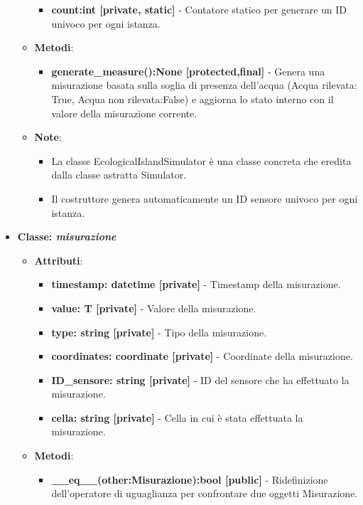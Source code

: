 \begin{itemize}
\begin{itemize}
    \begin{itemize}
        \item \textbf{count:int [private, static]} - Contatore statico per generare un ID univoco per ogni istanza.
    \end{itemize}
    \item    \textbf{Metodi}: 
    \begin{itemize}
        \item \textbf{generate\_measure():None [protected,final]} - Genera una misurazione basata sulla soglia di presenza dell'acqua (Acqua rilevata: True, Acqua non rilevata:False) e aggiorna lo stato interno con il valore della misurazione corrente.
    \end{itemize}
    \item    \textbf{Note}:
    \begin{itemize}
        \item La classe EcologicalIslandSimulator è una classe concreta che eredita dalla classe astratta Simulator.
        \item Il costruttore genera automaticamente un ID sensore univoco per ogni istanza.
    \end{itemize}
\end{itemize}
    \item{\textbf{Classe: \textit{misurazione}}}
    \begin{itemize}
        \item   \textbf{Attributi}: 
    \begin{itemize}
        \item \textbf{timestamp: datetime [private]} - Timestamp della misurazione.
        \item \textbf{value: T [private]} - Valore della misurazione.
        \item \textbf{type: string [private]} - Tipo della misurazione.
        \item \textbf{coordinates: coordinate [private]} - Coordinate della misurazione.
        \item \textbf{ID\_sensore: string [private]} - ID del sensore che ha effettuato la misurazione.
        \item \textbf{cella: string [private]} - Cella in cui è stata effettuata la misurazione.
    \end{itemize}
    \item   \textbf{Metodi}: 
    \begin{itemize}
        \item \textbf{\_\_eq\_\_(other:Misurazione):bool [public]} - Ridefinizione dell'operatore di uguaglianza per confrontare due oggetti Misurazione.

\end{itemize}
\end{itemize}
\end{itemize}
